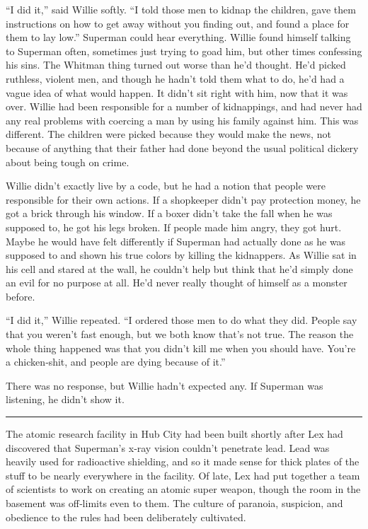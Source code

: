 \documentclass[ebook,12pt]{memoir}
\begin{document}
``I did it,'' said Willie softly. ``I told those men to kidnap the
children, gave them instructions on how to get away without you finding
out, and found a place for them to lay low.'' Superman could hear
everything. Willie found himself talking to Superman often, sometimes
just trying to goad him, but other times confessing his sins. The
Whitman thing turned out worse than he'd thought. He'd picked ruthless,
violent men, and though he hadn't told them what to do, he'd had a vague
idea of what would happen. It didn't sit right with him, now that it was
over. Willie had been responsible for a number of kidnappings, and had
never had any real problems with coercing a man by using his family
against him. This was different. The children were picked because they
would make the news, not because of anything that their father had done
beyond the usual political dickery about being tough on crime.

Willie didn't exactly live by a code, but he had a notion that people
were responsible for their own actions. If a shopkeeper didn't pay
protection money, he got a brick through his window. If a boxer didn't
take the fall when he was supposed to, he got his legs broken. If people
made him angry, they got hurt. Maybe he would have felt differently if
Superman had actually done as he was supposed to and shown his true
colors by killing the kidnappers. As Willie sat in his cell and stared
at the wall, he couldn't help but think that he'd simply done an evil
for no purpose at all. He'd never really thought of himself as a monster
before.

``I did it,'' Willie repeated. ``I ordered those men to do what they
did. People say that you weren't fast enough, but we both know that's
not true. The reason the whole thing happened was that you didn't kill
me when you should have. You're a chicken‐shit, and people are dying
because of it.''

There was no response, but Willie hadn't expected any. If Superman was
listening, he didn't show it.

\begin{center}\rule{0.5\linewidth}{\linethickness}\end{center}

The atomic research facility in Hub City had been built shortly after
Lex had discovered that Superman's x‐ray vision couldn't penetrate lead.
Lead was heavily used for radioactive shielding, and so it made sense
for thick plates of the stuff to be nearly everywhere in the facility.
Of late, Lex had put together a team of scientists to work on creating
an atomic super weapon, though the room in the basement was off‐limits
even to them. The culture of paranoia, suspicion, and obedience to the
rules had been deliberately cultivated.
\end{document}
